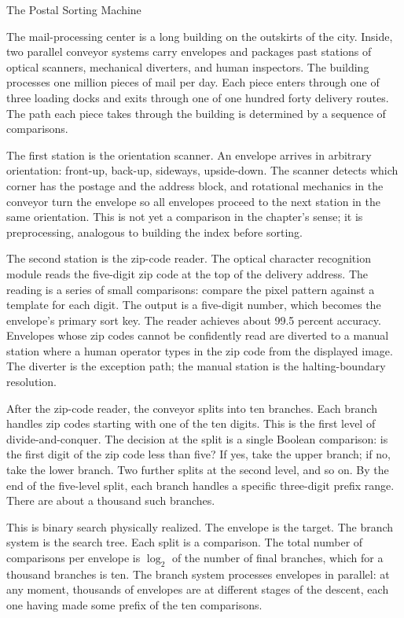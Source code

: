 \begin{coda}{The Postal Sorting Machine}

The mail-processing center is a long building on the outskirts of the
city. Inside, two parallel conveyor systems carry envelopes and packages
past stations of optical scanners, mechanical diverters, and human
inspectors. The building processes one million pieces of mail per day.
Each piece enters through one of three loading docks and exits through
one of one hundred forty delivery routes. The path each piece takes
through the building is determined by a sequence of comparisons.

The first station is the orientation scanner. An envelope arrives in
arbitrary orientation: front-up, back-up, sideways, upside-down. The
scanner detects which corner has the postage and the address block,
and rotational mechanics in the conveyor turn the envelope so all
envelopes proceed to the next station in the same orientation. This is
not yet a comparison in the chapter's sense; it is preprocessing,
analogous to building the index before sorting.

The second station is the zip-code reader. The optical character
recognition module reads the five-digit zip code at the top of the
delivery address. The reading is a series of small comparisons:
compare the pixel pattern against a template for each digit. The
output is a five-digit number, which becomes the envelope's primary
sort key. The reader achieves about 99.5 percent accuracy. Envelopes
whose zip codes cannot be confidently read are diverted to a manual
station where a human operator types in the zip code from the
displayed image. The diverter is the exception path; the manual
station is the halting-boundary resolution.

After the zip-code reader, the conveyor splits into ten branches. Each
branch handles zip codes starting with one of the ten digits. This is
the first level of divide-and-conquer. The decision at the split is a
single Boolean comparison: is the first digit of the zip code less
than five? If yes, take the upper branch; if no, take the lower branch.
Two further splits at the second level, and so on. By the end of the
five-level split, each branch handles a specific three-digit prefix
range. There are about a thousand such branches.

This is binary search physically realized. The envelope is the target.
The branch system is the search tree. Each split is a comparison. The
total number of comparisons per envelope is $\log_2$ of the number of
final branches, which for a thousand branches is ten. The branch
system processes envelopes in parallel: at any moment, thousands of
envelopes are at different stages of the descent, each one having
made some prefix of the ten comparisons.


\end{coda}
